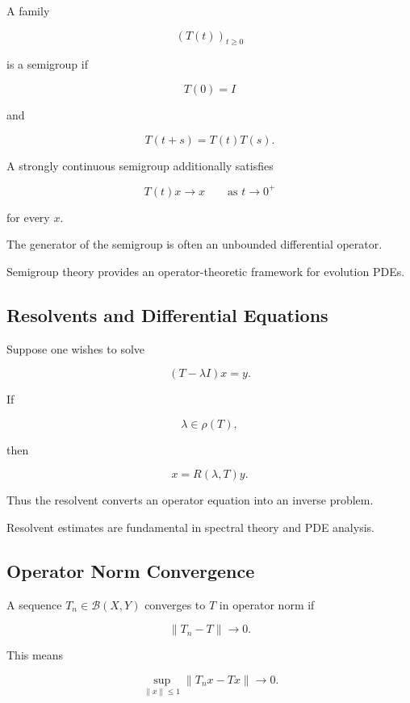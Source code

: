 A family

\[
(T(t))_{t\geq0}
\]

is a semigroup if

\[
\boxed{
T(0)=I
}
\]

and

\[
\boxed{
T(t+s)
=
T(t)T(s).
}
\]

A strongly continuous semigroup additionally satisfies

\[
\boxed{
T(t)x\to x
\qquad
\text{as }t\to0^+
}
\]

for every \(x\).

The generator of the semigroup is often an unbounded differential
operator.

Semigroup theory provides an operator-theoretic framework for evolution
PDEs.

\subsection{Resolvents and Differential Equations}
\label{subsec:resolvent-differential-equations}

Suppose one wishes to solve

\[
\boxed{
(T-\lambda I)x=y.
}
\]

If

\[
\lambda\in\rho(T),
\]

then

\[
\boxed{
x
=
R(\lambda,T)y.
}
\]

Thus the resolvent converts an operator equation into an inverse problem.

Resolvent estimates are fundamental in spectral theory and PDE analysis.

\subsection{Operator Norm Convergence}
\label{subsec:operator-norm-convergence}

A sequence \(T_n\in\mathcal{B}(X,Y)\) converges to \(T\) in operator norm
if

\[
\boxed{
\|T_n-T\|\to0.
}
\]

This means

\[
\boxed{
\sup_{\|x\|\leq1}
\|T_nx-Tx\|
\to0.
}
\]

